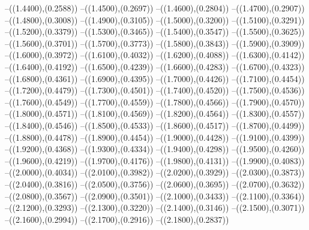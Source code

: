 {	--({\sx*(1.4400)},{\sy*(0.2588)})
	--({\sx*(1.4500)},{\sy*(0.2697)})
	--({\sx*(1.4600)},{\sy*(0.2804)})
	--({\sx*(1.4700)},{\sy*(0.2907)})
	--({\sx*(1.4800)},{\sy*(0.3008)})
	--({\sx*(1.4900)},{\sy*(0.3105)})
	--({\sx*(1.5000)},{\sy*(0.3200)})
	--({\sx*(1.5100)},{\sy*(0.3291)})
	--({\sx*(1.5200)},{\sy*(0.3379)})
	--({\sx*(1.5300)},{\sy*(0.3465)})
	--({\sx*(1.5400)},{\sy*(0.3547)})
	--({\sx*(1.5500)},{\sy*(0.3625)})
	--({\sx*(1.5600)},{\sy*(0.3701)})
	--({\sx*(1.5700)},{\sy*(0.3773)})
	--({\sx*(1.5800)},{\sy*(0.3843)})
	--({\sx*(1.5900)},{\sy*(0.3909)})
	--({\sx*(1.6000)},{\sy*(0.3972)})
	--({\sx*(1.6100)},{\sy*(0.4032)})
	--({\sx*(1.6200)},{\sy*(0.4088)})
	--({\sx*(1.6300)},{\sy*(0.4142)})
	--({\sx*(1.6400)},{\sy*(0.4192)})
	--({\sx*(1.6500)},{\sy*(0.4239)})
	--({\sx*(1.6600)},{\sy*(0.4283)})
	--({\sx*(1.6700)},{\sy*(0.4323)})
	--({\sx*(1.6800)},{\sy*(0.4361)})
	--({\sx*(1.6900)},{\sy*(0.4395)})
	--({\sx*(1.7000)},{\sy*(0.4426)})
	--({\sx*(1.7100)},{\sy*(0.4454)})
	--({\sx*(1.7200)},{\sy*(0.4479)})
	--({\sx*(1.7300)},{\sy*(0.4501)})
	--({\sx*(1.7400)},{\sy*(0.4520)})
	--({\sx*(1.7500)},{\sy*(0.4536)})
	--({\sx*(1.7600)},{\sy*(0.4549)})
	--({\sx*(1.7700)},{\sy*(0.4559)})
	--({\sx*(1.7800)},{\sy*(0.4566)})
	--({\sx*(1.7900)},{\sy*(0.4570)})
	--({\sx*(1.8000)},{\sy*(0.4571)})
	--({\sx*(1.8100)},{\sy*(0.4569)})
	--({\sx*(1.8200)},{\sy*(0.4564)})
	--({\sx*(1.8300)},{\sy*(0.4557)})
	--({\sx*(1.8400)},{\sy*(0.4546)})
	--({\sx*(1.8500)},{\sy*(0.4533)})
	--({\sx*(1.8600)},{\sy*(0.4517)})
	--({\sx*(1.8700)},{\sy*(0.4499)})
	--({\sx*(1.8800)},{\sy*(0.4478)})
	--({\sx*(1.8900)},{\sy*(0.4454)})
	--({\sx*(1.9000)},{\sy*(0.4428)})
	--({\sx*(1.9100)},{\sy*(0.4399)})
	--({\sx*(1.9200)},{\sy*(0.4368)})
	--({\sx*(1.9300)},{\sy*(0.4334)})
	--({\sx*(1.9400)},{\sy*(0.4298)})
	--({\sx*(1.9500)},{\sy*(0.4260)})
	--({\sx*(1.9600)},{\sy*(0.4219)})
	--({\sx*(1.9700)},{\sy*(0.4176)})
	--({\sx*(1.9800)},{\sy*(0.4131)})
	--({\sx*(1.9900)},{\sy*(0.4083)})
	--({\sx*(2.0000)},{\sy*(0.4034)})
	--({\sx*(2.0100)},{\sy*(0.3982)})
	--({\sx*(2.0200)},{\sy*(0.3929)})
	--({\sx*(2.0300)},{\sy*(0.3873)})
	--({\sx*(2.0400)},{\sy*(0.3816)})
	--({\sx*(2.0500)},{\sy*(0.3756)})
	--({\sx*(2.0600)},{\sy*(0.3695)})
	--({\sx*(2.0700)},{\sy*(0.3632)})
	--({\sx*(2.0800)},{\sy*(0.3567)})
	--({\sx*(2.0900)},{\sy*(0.3501)})
	--({\sx*(2.1000)},{\sy*(0.3433)})
	--({\sx*(2.1100)},{\sy*(0.3364)})
	--({\sx*(2.1200)},{\sy*(0.3293)})
	--({\sx*(2.1300)},{\sy*(0.3220)})
	--({\sx*(2.1400)},{\sy*(0.3146)})
	--({\sx*(2.1500)},{\sy*(0.3071)})
	--({\sx*(2.1600)},{\sy*(0.2994)})
	--({\sx*(2.1700)},{\sy*(0.2916)})
	--({\sx*(2.1800)},{\sy*(0.2837)})
}
